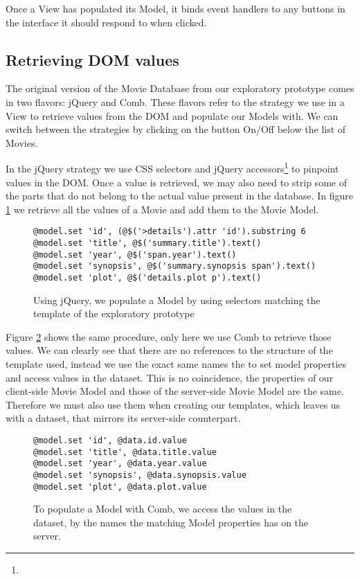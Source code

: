 \documentclass[thesis.tex]{subfiles}
\begin{document}
Once a View has populated its Model, it binds event handlers to any buttons
in the interface it should respond to when clicked.

\subsection{Retrieving DOM values}
The original version of the Movie Database from our exploratory prototype comes
in two flavors: jQuery and Comb.
These flavors refer to the strategy we use in a View to retrieve values from the
DOM and populate our Models with. We can switch between the strategies by
clicking on the button On/Off below the list of Movies.

In the jQuery strategy we use CSS selectors and jQuery accessors\footnote{
} to pinpoint values in the DOM. Once a value is retrieved, we may also need to
strip some of the parts that do not belong to the actual value present in the
database. In figure \ref{fig:movie-jquery-prototype} we retrieve all the
values of a Movie and add them to the Movie Model.
\begin{figure}
	\centering
	\begin{lstlisting}
@model.set 'id', (@$('>details').attr 'id').substring 6
@model.set 'title', @$('summary.title').text()
@model.set 'year', @$('span.year').text()
@model.set 'synopsis', @$('summary.synopsis span').text()
@model.set 'plot', @$('details.plot p').text()
	\end{lstlisting}
	\caption{Using jQuery, we populate a Model by using selectors matching the
	template of the exploratory prototype}
	\label{fig:movie-jquery-prototype}
\end{figure}

Figure \ref{fig:movie-comb-prototype} shows the same procedure, only here we
use Comb to retrieve those values. We can clearly see that there are no
references to the structure of the template used, instead we use the exact same
names the to set model properties and access values in the dataset.
This is no coincidence, the properties of our client-side Movie Model and
those of the server-side Movie Model are the same. Therefore we must also use
them when creating our templates, which leaves us with a dataset, that mirrors
its server-side counterpart.
\begin{figure}
	\centering
	\begin{lstlisting}
@model.set 'id', @data.id.value
@model.set 'title', @data.title.value
@model.set 'year', @data.year.value
@model.set 'synopsis', @data.synopsis.value
@model.set 'plot', @data.plot.value
	\end{lstlisting}
	\caption{To populate a Model with Comb, we access the values in the dataset,
	by the names the matching Model properties has on the server.}
	\label{fig:movie-comb-prototype}
\end{figure}
\end{document}
